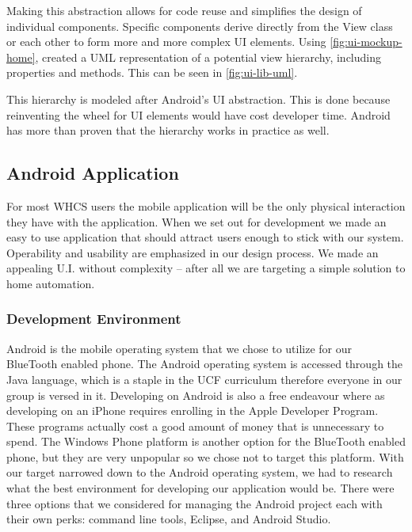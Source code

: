 
Making this abstraction allows for code reuse and simplifies the design of
individual components. Specific components derive directly from the View
class or each other to form more and more complex UI elements. Using
\autoref{fig:ui-mockup-home}, created a UML representation of a
potential view hierarchy, including properties and methods. This can be seen in
\autoref{fig:ui-lib-uml}.


This hierarchy is modeled after Android's UI abstraction. This is done because
reinventing the wheel for UI elements would have cost developer time. Android has
more than proven that the hierarchy works in practice as well.

\subsection{Android Application} For most WHCS users the mobile application
will be the only physical interaction they have with the application. When we
set out for development we made an easy to use application that
should attract users enough to stick with our system.  Operability and usability are
emphasized in our design process. We made an appealing U.I. without
complexity -- after all we are targeting a simple solution to home automation.

\subsubsection{Development Environment} Android is the mobile operating system
that we chose to utilize for our BlueTooth enabled phone. The Android operating
system is accessed through the Java language, which is a staple in the UCF
curriculum therefore everyone in our group is versed in it. Developing on
Android is also a free endeavour where as developing on an iPhone requires
enrolling in the Apple Developer Program. These programs actually cost a good
amount of money that is unnecessary to spend. The Windows Phone platform is
another option for the BlueTooth enabled phone, but they are very unpopular so
we chose not to target this platform. With our target narrowed down to the
Android operating system, we had to research what the best environment for
developing our application would be. There were three options that we
considered for managing the Android project each with their own perks: command
line tools, Eclipse, and Android Studio.

